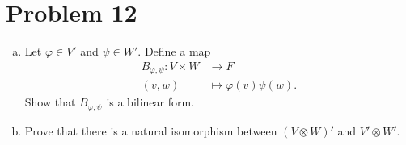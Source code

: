 \documentclass[10pt]{mypackage}
\begin{document}
\section{Problem 12}%
\begin{problem}\hfill
  \begin{enumerate}[(a)]
    \item Let $\varphi\in V'$ and $\psi\in W'$. Define a map
      \begin{align*}
        B_{\varphi,\psi}:V\times W &\rightarrow F\\
        \left(v,w\right) &\mapsto \varphi(v)\psi(w).
      \end{align*}
      Show that $B_{\varphi,\psi}$ is a bilinear form.
    \item Prove that there is a natural isomorphism between $\left(V\otimes W\right)'$ and $V'\otimes W'$.
  \end{enumerate}
\end{problem}
\end{document}
